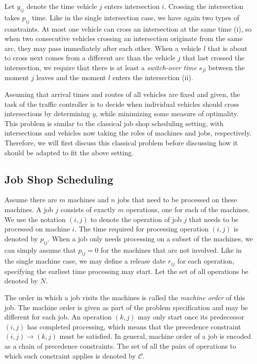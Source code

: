 \documentclass{article}
\theoremstyle{definition}
\theoremstyle{plain}
\begin{document}
Let $y_{ij}$ denote the time vehicle $j$ enters intersection $i$. Crossing the
intersection takes $p_{ij}$ time. Like in the single intersection case, we have
again two types of constraints. At most one vehicle can cross an intersection at
the same time (i), so when two consecutive vehicles crossing an intersection
originate from the same arc, they may pass immediately after each other. When a
vehicle $l$ that is about to cross next comes from a different arc than the
vehicle $j$ that last crossed the intersection, we require that there is at
least a \textit{switch-over time} $s_{jl}$ between the moment $j$ leaves and the
moment $l$ enters the intersection (ii).

Assuming that arrival times and routes of all vehicles are fixed and given, the
task of the traffic controller is to decide when individual vehicles should
cross intersections by determining $y$, while minimizing some measure of
optimality. This problem is similar to the classical job shop scheduling
setting, with intersections and vehicles now taking the roles of machines and
jobs, respectively. Therefore, we will first discuss this classical problem
before discussing how it should be adapted to fit the above setting.


\subsection{Job Shop Scheduling}

Assume there are $m$ machines and $n$ jobs that need to be processed on these
machines. A job $j$ consists of exactly $m$ operations, one for each of the
machines. We use the notation $(i,j)$ to denote the operation of job $j$ that
needs to be processed on machine $i$. The time required for processing operation
$(i,j)$ is denoted by $p_{ij}$. When a job only needs processing on a subset of
the machines, we can simply assume that $p_{ij} = 0$ for the machines that are
not involved. Like in the single machine case, we may define a release date
$r_{ij}$ for each operation, specifying the earliest time processing may start.
Let the set of all operations be denoted by $N$.

The order in which a job visits the machines is called the \textit{machine
  order} of this job. The machine order is given as part of the problem
specification and may be different for each job. An operation $(k,j)$ may only
start once its predecessor $(i,j)$ has completed processing, which means that
the precedence constraint $(i,j) \rightarrow (k,j)$ must be satisfied. In
general, machine order of a job is encoded as a chain of precedence constraints.
The set of all the pairs of operations to which such constraint applies is
denoted by $\mathcal{C}$.
\end{document}
